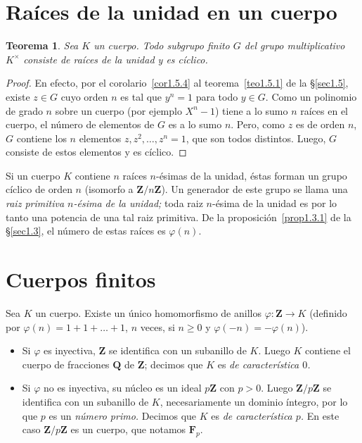\documentclass[oneside,bibtotoc,leqno,spanish]{amsbook}
\newcommand{\QQ}{\mathbf{Q}}
\newcommand{\ZZ}{\mathbf{Z}}
\newcommand{\FF}{\mathbf{F}}
\newcommand{\QED}{}%
\renewcommand{\to}[1][]{\xrightarrow{#1}}
\numberwithin{equation}{section}
\theoremstyle{defi}
\theoremstyle{note}
\newtheorem{theorem}{Teorema}
\theoremstyle{rem}
\numberwithin{theorem}{section}
\numberwithin{proposition}{section}
\numberwithin{definition}{section}
\numberwithin{lemma}{section}
\numberwithin{corollary}{section}
\numberwithin{example}{section}
\numberwithin{footnote}{section}%
\begin{document}
\section{Ra\'ices de la unidad en un cuerpo}\label{sec1.6}

\begin{theorem}\label{teo1.6.1}
Sea $K$ un cuerpo. Todo subgrupo finito $G$ del grupo
multiplicativo $K^{\times}$ consiste de ra\'ices de la unidad y
es c\'iclico.
\end{theorem}

\begin{proof}
En efecto, por el corolario~\ref{cor1.5.4} al teorema~\ref{teo1.5.1}
de la \S\ref{sec1.5}, existe $z\in G$ cuyo orden $n$ es tal que $y^{n}=1$
para todo $y\in G$. Como un polinomio de grado $n$ sobre un cuerpo
(por ejemplo $X^{n}-1$) tiene a lo sumo $n$ ra\'ices en el
cuerpo, el n\'umero de elementos de $G$ es a lo sumo $n$.
Pero, como $z$ es de orden $n$, $G$ contiene los $n$ elementos
$z, z^{2},\dots,z^{n}=1$, que son todos distintos. Luego, $G$
consiste de estos elementos y es c\'iclico.%
\end{proof}

Si un cuerpo $K$ contiene $n$ ra\'ices $n$-\'esimas de la unidad,
\'estas forman un grupo c\'iclico de orden $n$ (isomorfo a
$\ZZ/n\ZZ$). Un generador de este grupo se llama una
{\em raiz primitiva $n$-\'esima de la unidad;} toda raiz $n$-\'esima
de la unidad es por lo tanto una potencia de una tal raiz primitiva.
De la proposici\'on~\ref{prop1.3.1} de la \S\ref{sec1.3}, el n\'umero de estas ra\'ices
es $\varphi(n)$.

\section{Cuerpos finitos}\label{sec1.7}

Sea $K$ un cuerpo. Existe un \'unico homomorfismo de anillos
$\varphi:\ZZ\to K$ (definido por $\varphi(n)=1+1+\dots+1$,
$n$ veces, si $n\geq 0$ y $\varphi(-n) = -\varphi(n)$).

\begin{itemize}
\item Si $\varphi$ es inyectiva, $\ZZ$ se identifica con un
subanillo de $K$. Luego $K$ contiene el cuerpo de fracciones
$\QQ$ de $\ZZ$; decimos que $K$ es {\em de caracter\'istica
$0$.}
\item Si $\varphi$ no es inyectiva, su n\'ucleo es un ideal
$p\ZZ$ con $p > 0$. Luego $\ZZ/p\ZZ$ se identifica con un
subanillo de $K$, necesariamente un dominio \'integro, por
lo que $p$ es un {\em n\'umero primo.} Decimos que $K$ es
{\em de caracter\'istica $p$.} En este caso $\ZZ/p\ZZ$ es un
cuerpo, que notamos $\FF_{p}$.
\end{itemize}
\end{document}
